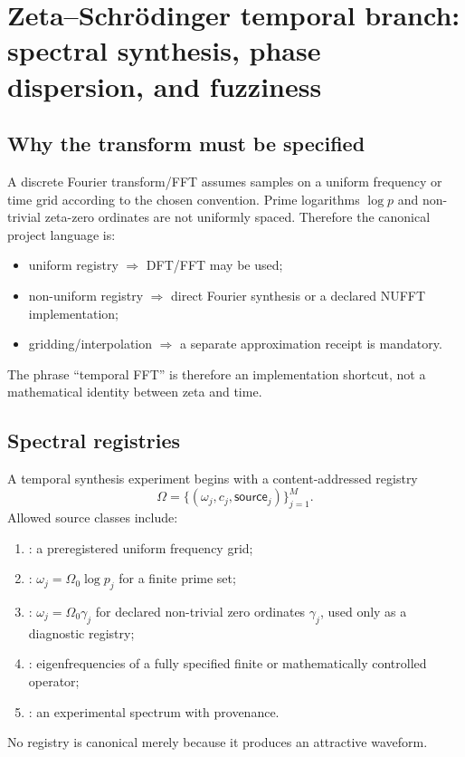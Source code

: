 \section{Zeta--Schrödinger temporal branch: spectral synthesis, phase dispersion, and fuzziness}

\subsection{Why the transform must be specified}

A discrete Fourier transform/FFT assumes samples on a uniform frequency or time grid according to the chosen convention. Prime logarithms \(\log p\) and non-trivial zeta-zero ordinates are not uniformly spaced. Therefore the canonical project language is:
\begin{itemize}[leftmargin=2em]
\item uniform registry \(\Rightarrow\) DFT/FFT may be used;
\item non-uniform registry \(\Rightarrow\) direct Fourier synthesis or a declared NUFFT implementation;
\item gridding/interpolation \(\Rightarrow\) a separate approximation receipt is mandatory.
\end{itemize}
The phrase ``temporal FFT'' is therefore an implementation shortcut, not a mathematical identity between zeta and time.

\subsection{Spectral registries}

A temporal synthesis experiment begins with a content-addressed registry
\begin{equation}
\Omega=\{(\omega_j,c_j,\mathsf{source}_j)\}_{j=1}^{M}.
\end{equation}
Allowed source classes include:
\begin{enumerate}[leftmargin=2em]
\item {}: a preregistered uniform frequency grid;
\item {}: \(\omega_j=\Omega_0\log p_j\) for a finite prime set;
\item {}: \(\omega_j=\Omega_0\gamma_j\) for declared non-trivial zero ordinates \(\gamma_j\), used only as a diagnostic registry;
\item {}: eigenfrequencies of a fully specified finite or mathematically controlled operator;
\item {}: an experimental spectrum with provenance.
\end{enumerate}
No registry is canonical merely because it produces an attractive waveform.

